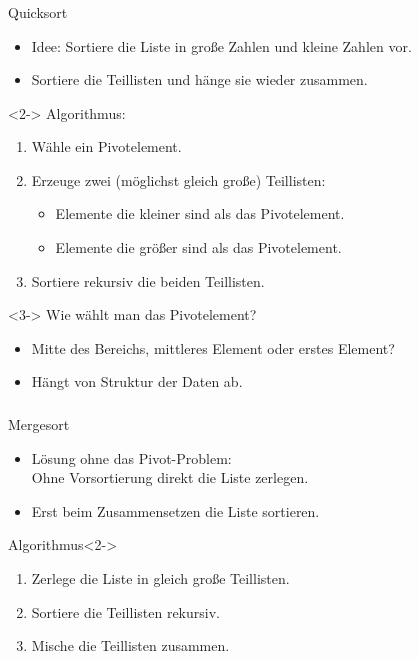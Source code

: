 \begin{frame}
\frametitle{\insertsection}
\begin{block}
{Quicksort}
\begin{itemize}
	\item Idee: Sortiere die Liste in \alert{große Zahlen} und \alert{kleine Zahlen} vor.
	\item Sortiere die Teillisten und hänge sie wieder zusammen.
\end{itemize}
\end{block}
\begin{block}<2->
{Algorithmus:}
\begin{enumerate}
	\item Wähle ein \alert{Pivotelement}.
	\item Erzeuge zwei (möglichst gleich große) Teillisten:
	\begin{itemize}
		\item Elemente die \alert{kleiner} sind als das Pivotelement.
		\item Elemente die \alert{größer} sind als das Pivotelement.
	\end{itemize}
	\item Sortiere rekursiv die beiden Teillisten.
\end{enumerate}
\end{block}
\begin{block}<3->
{Wie wählt man das Pivotelement?}
\begin{itemize}
	\item Mitte des Bereichs, mittleres Element oder erstes Element?
	\item Hängt von Struktur der Daten ab.
\end{itemize}
\end{block}
\end{frame}

\begin{frame}
\frametitle{\insertsection}
\begin{block}
{Mergesort}
\begin{itemize}
	\item Lösung ohne das Pivot-Problem: \\ Ohne Vorsortierung direkt die Liste zerlegen.
	\item Erst beim Zusammensetzen die Liste sortieren.
\end{itemize}
\end{block}
\begin{block}
{Algorithmus}<2->
\begin{enumerate}
	\item Zerlege die Liste in gleich große Teillisten.
	\item Sortiere die Teillisten rekursiv.
	\item \alert{Mische} die Teillisten zusammen.
\end{enumerate}
\end{block}
\end{frame}

\endinput

\begin{frame}
\frametitle{\insertsection}
\begin{block}
{}
\end{block}
\end{frame}